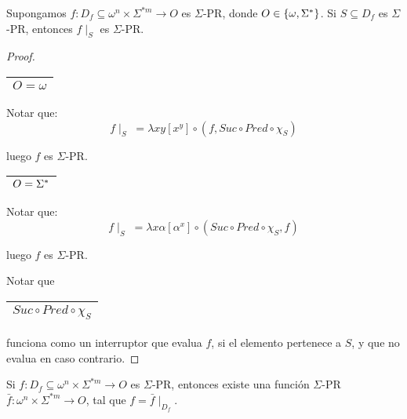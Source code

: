   \pagebreak
  \begin{lemma}
    \PN Supongamos $f: D_{f} \subseteq \omega^{n} \times \Sigma^{\ast m} \rightarrow O$ es $\Sigma$-PR, donde $O \in
    \{\omega, \Sigma^{\ast}\}$. Si $S \subseteq D_{f}$ es $\Sigma$-PR, entonces $f \mid_{S}$ es $\Sigma$-PR.
  \end{lemma}
  \begin{proof}
    \begin{tabular}{|c|} \hline $O = \omega$ \\\hline \end{tabular} Notar que:
    \[
    f \mid_{S} \; = \lambda xy \left[x^{y}\right] \circ (f, Suc \circ Pred \circ \chi_{S})
    \]

    \PN luego $f$ es $\Sigma$-PR.

    \PN \begin{tabular}{|c|} \hline $O = \Sigma^{\ast}$ \\\hline \end{tabular} Notar que:
    \[
      f \mid_{S} \; = \lambda x\alpha \left[\alpha^{x}\right] \circ (Suc \circ Pred \circ \chi_{S}, f)
    \]

    \PN luego $f$ es $\Sigma$-PR.

    \vspace{3mm}
    \PN Notar que \begin{tabular}{|c|} \hline $Suc \circ Pred \circ \chi_{S}$ \\\hline \end{tabular} funciona como un
    interruptor que evalua $f$, si el elemento pertenece a $S$, y que no evalua en caso contrario.
  \end{proof}

  \begin{lemma}
    \PN Si $f: D_{f} \subseteq \omega^{n} \times \Sigma^{\ast m} \rightarrow O$ es $\Sigma$-PR, entonces existe una
    función $\Sigma$-PR
    \PN $\bar{f}: \omega^{n} \times \Sigma^{\ast m} \rightarrow O$, tal que $f = \bar{f} \mid_{D_{f}}$.
  \end{lemma}

